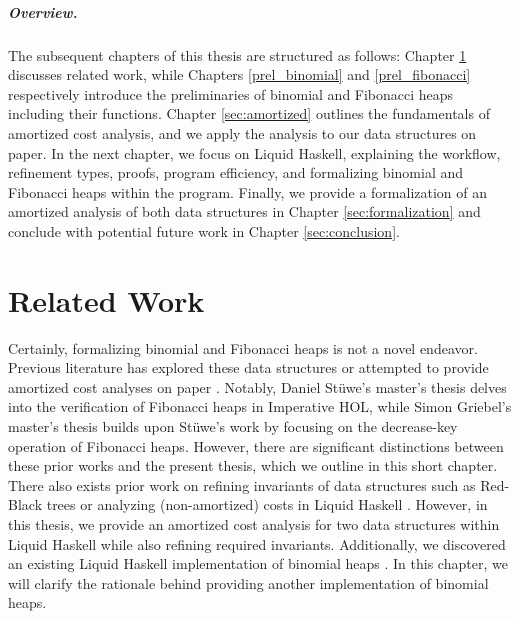 \documentclass{clmthesis}
\begin{document}
\paragraph{Overview.} The subsequent chapters of this thesis are structured as follows: Chapter \ref{sec:related} discusses related work, while Chapters \ref{prel_binomial} and \ref{prel_fibonacci} respectively introduce the preliminaries of binomial and Fibonacci heaps including their functions. Chapter \ref{sec:amortized} outlines the fundamentals of amortized cost analysis, and we apply the analysis to our data structures on paper. In the next chapter, we focus on Liquid Haskell, explaining the workflow, refinement types, proofs, program efficiency, and formalizing binomial and Fibonacci heaps within the program. Finally, we provide a formalization of an amortized analysis of both data structures in Chapter \ref{sec:formalization} and conclude with potential future work in Chapter \ref{sec:conclusion}.



\chapter{Related Work}\label{sec:related}

Certainly, formalizing binomial and Fibonacci heaps is not a novel endeavor. Previous literature has explored these data structures or attempted to provide amortized cost analyses on paper \cite{brodal2012strict,thomas2022,skew2020,okasaki1999,sadagopanFib,thesis2019stuewe, tarjan1985amortized}. Notably, Daniel Stüwe's master's thesis \cite{thesis2019stuewe} delves into the verification of Fibonacci heaps in Imperative HOL, while Simon Griebel's master's thesis \cite{thesis2019griebel} builds upon Stüwe's work by focusing on the decrease-key operation of Fibonacci heaps. However, there are significant distinctions between these prior works and the present thesis, which we outline in this short chapter. There also exists prior work on refining invariants of data structures such as Red-Black trees \cite{vazou2014liquidhaskell} or analyzing (non-amortized) costs in Liquid Haskell \cite{handley2019liquidate}. However, in this thesis, we provide an amortized cost analysis for two data structures within Liquid Haskell while also refining required invariants. Additionally, we discovered an existing Liquid Haskell implementation of binomial heaps \cite{skew2020}. In this chapter, we will clarify the rationale behind providing another implementation of binomial heaps.
\end{document}
